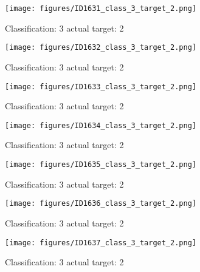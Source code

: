 \begin{figure}[h!]
\begin{center}
\texttt{[image: figures/ID1631\_class\_3\_target\_2.png]}
\end{center}
\caption{ Classification: 3 actual target: 2}
\label{fig:ID1631_class_3_target_2}
\end{figure}
\begin{figure}[h!]
\begin{center}
\texttt{[image: figures/ID1632\_class\_3\_target\_2.png]}
\end{center}
\caption{ Classification: 3 actual target: 2}
\label{fig:ID1632_class_3_target_2}
\end{figure}
\begin{figure}[h!]
\begin{center}
\texttt{[image: figures/ID1633\_class\_3\_target\_2.png]}
\end{center}
\caption{ Classification: 3 actual target: 2}
\label{fig:ID1633_class_3_target_2}
\end{figure}
\begin{figure}[h!]
\begin{center}
\texttt{[image: figures/ID1634\_class\_3\_target\_2.png]}
\end{center}
\caption{ Classification: 3 actual target: 2}
\label{fig:ID1634_class_3_target_2}
\end{figure}
\begin{figure}[h!]
\begin{center}
\texttt{[image: figures/ID1635\_class\_3\_target\_2.png]}
\end{center}
\caption{ Classification: 3 actual target: 2}
\label{fig:ID1635_class_3_target_2}
\end{figure}
\begin{figure}[h!]
\begin{center}
\texttt{[image: figures/ID1636\_class\_3\_target\_2.png]}
\end{center}
\caption{ Classification: 3 actual target: 2}
\label{fig:ID1636_class_3_target_2}
\end{figure}
\begin{figure}[h!]
\begin{center}
\texttt{[image: figures/ID1637\_class\_3\_target\_2.png]}
\end{center}
\caption{ Classification: 3 actual target: 2}
\label{fig:ID1637_class_3_target_2}
\end{figure}
